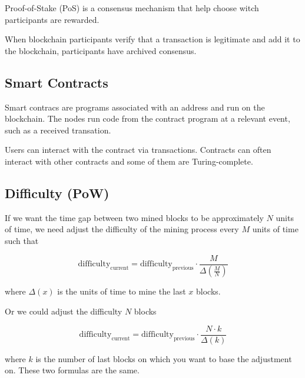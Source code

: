 \documentclass[a4paper]{article}
\begin{document}
Proof-of-Stake (PoS) is a consensus mechanism that help choose witch participants
are rewarded.

When blockchain participants verify that a transaction is legitimate and add it
to the blockchain, participants have archived consensus.

\subsection{Smart Contracts}

Smart contracs are programs associated with an address and run on the blockchain.
The nodes run code from the contract program at a relevant event, such as a received transation.

Users can interact with the contract via transactions. Contracts can often interact with other contracts
and some of them are Turing-complete.

%
%

\subsection{Difficulty (PoW)}

If we want the time gap between two mined blocks to be approximately
\(N\) units of time, we need adjust the difficulty of the mining process every 
\(M\) units of time such that

\[
    \text{difficulty}_\text{current} =
    \text{difficulty}_\text{previous}
    \cdot \frac{M}{\Delta (\frac{M}{N})}
\]

where \(\Delta (x)\) is the units of time to mine the last \(x\) blocks.

Or we could adjust the difficulty \(N\) blocks

\[
    \text{difficulty}_\text{current} =
    \text{difficulty}_\text{previous}
    \cdot \frac{N \cdot k}{\Delta(k)}
\]

where \(k\) is the number of last blocks on which you want to
base the adjustment on. These two formulas are the same.
\end{document}
